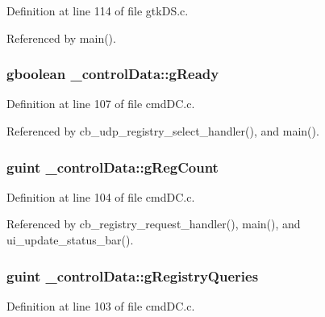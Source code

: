 Definition at line 114 of file gtk\+D\+S.\+c.



Referenced by main().

\hypertarget{struct__control_data_a04238362a20b6616913d869fc464e4b2}{}
\subsubsection[{g\+Ready}]{\setlength{\rightskip}{0pt plus 5cm}gboolean \+\_\+control\+Data\+::g\+Ready}\label{struct__control_data_a04238362a20b6616913d869fc464e4b2}


Definition at line 107 of file cmd\+D\+C.\+c.



Referenced by cb\+\_\+udp\+\_\+registry\+\_\+select\+\_\+handler(), and main().

\hypertarget{struct__control_data_a81bfc0d50c23ebe6708e065659d11eb8}{}
\subsubsection[{g\+Reg\+Count}]{\setlength{\rightskip}{0pt plus 5cm}guint \+\_\+control\+Data\+::g\+Reg\+Count}\label{struct__control_data_a81bfc0d50c23ebe6708e065659d11eb8}


Definition at line 104 of file cmd\+D\+C.\+c.



Referenced by cb\+\_\+registry\+\_\+request\+\_\+handler(), main(), and ui\+\_\+update\+\_\+status\+\_\+bar().

\hypertarget{struct__control_data_ab4837eb7cc16bf85fe0bd839a428eaa5}{}
\subsubsection[{g\+Registry\+Queries}]{\setlength{\rightskip}{0pt plus 5cm}guint \+\_\+control\+Data\+::g\+Registry\+Queries}\label{struct__control_data_ab4837eb7cc16bf85fe0bd839a428eaa5}


Definition at line 103 of file cmd\+D\+C.\+c.



